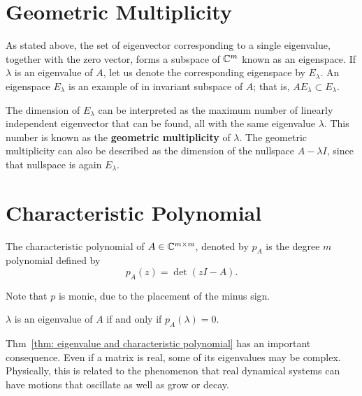 \section{Geometric Multiplicity} 
As stated above, the set of eigenvector corresponding to a single eigenvalue, together with the zero vector, forms a subspace of $ \mathbb{C}^m $ known as an eigenspace. If $ \lambda $ is an eigenvalue of $A$, let us denote the corresponding eigenspace by $ E_\lambda $. An eigenspace $ E_\lambda $ is an example of in invariant subspace of $A$; that is, $ AE_\lambda \subset E_\lambda $.     

The dimension of $ E_\lambda  $ can be interpreted as the maximum number of linearly independent eigenvector that can be found, all with the same eigenvalue $ \lambda  $.  This number is known as the \textbf{geometric multiplicity} of $ \lambda  $. The geometric multiplicity can also be described as the dimension of the nullspace $ A-\lambda I$, since that nullspace is again $ E_\lambda  $.  

\section{Characteristic Polynomial}

\begin{definition}
\label{def: Chracteristic Polynomial}
The characteristic polynomial of $A\in \mathbb{C}^{m\times m}$, denoted by $p_A$ is the degree $m$ polynomial defined by
\[
p_A(z) = \det (zI - A).  
\] 
\end{definition}

Note that $p$ is monic, due to the placement of the minus sign. 


\begin{theorem}
\label{thm: eigenvalue and characteristic polynomial}
$\lambda$ is an eigenvalue of $A$ if and only if $p_A(\lambda ) = 0$.  
\end{theorem}
Thm~\ref{thm: eigenvalue and characteristic polynomial} has an important consequence. Even if a matrix is real, some of its eigenvalues may be complex.  Physically, this is related to the phenomenon that real dynamical systems can have motions that oscillate as well as grow or decay. 

